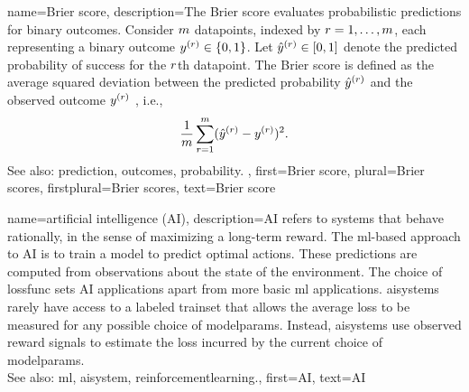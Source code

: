 {name={Brier score},
	description={The Brier score evaluates probabilistic \glspl{prediction} for binary \glspl{outcome}. 
		Consider $m$ \glspl{datapoint}, indexed by $r=1,\ldots,m$, 
		each representing a binary \gls{outcome} $y^{(r)} \in \{0,1\}$. 
		Let $\hat{y}^{(r)} \in [0,1]$ denote the predicted \gls{probability} 
		of success for the $r$th \gls{datapoint}. The Brier score is defined as the 
		average squared deviation between the predicted \gls{probability} $\hat{y}^{(r)}$ 
		and the observed \gls{outcome} $y^{(r)}$ \cite{Brier1950}, i.e., 
		\[
			\frac{1}{m}\sum_{r=1}^{m} (\hat{y}^{(r)} - y^{(r)})^2.
		\]
		See also: \gls{prediction}, \glspl{outcome}, \gls{probability}. },
	first={Brier score},
	plural={Brier scores},
	firstplural={Brier scores},
	text={Brier score}
}

{name={artificial intelligence (AI)}, 
	description={AI refers to systems that behave rationally, in the sense of 
		maximizing a long-term \gls{reward}. The \gls{ml}-based approach to AI is to train a \gls{model} to  
		predict optimal actions. These \glspl{prediction} are computed from observations about the \gls{state} of the 
		\gls{environment}. The choice of \gls{lossfunc} sets AI applications apart from more basic \gls{ml} applications. 
		\Glspl{aisystem} rarely have access to a labeled \gls{trainset} that allows the average \gls{loss} to be 
		measured for any possible choice of \glspl{modelparam}. Instead, \glspl{aisystem} use observed \gls{reward} 
		signals to estimate the \gls{loss} incurred by the current choice of \glspl{modelparam}.
				\\
		See also: \gls{ml}, \gls{aisystem}, \gls{reinforcementlearning}.},
	first={AI},
	text={AI} 
}
 
